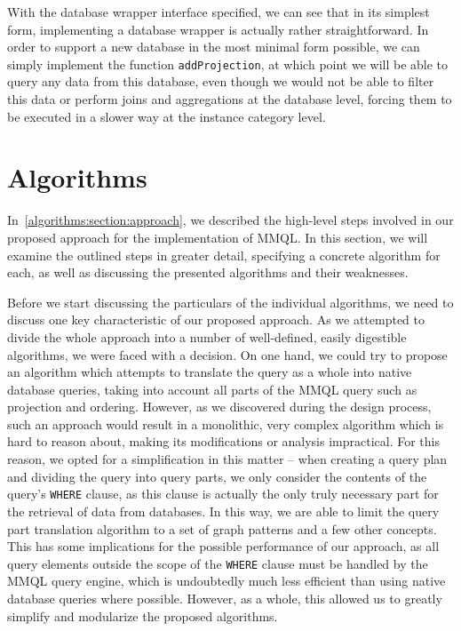 With the database wrapper interface specified, we can see that in its simplest form, implementing a database wrapper is actually rather straightforward.
In order to support a new database in the most minimal form possible, we can simply implement the function \texttt{addProjection}, at which point we will be able to query any data from this database, even though we would not be able to filter this data or perform joins and aggregations at the database level, forcing them to be executed in a slower way at the instance category level.

\section{Algorithms}

In~\cref{algorithms:section:approach}, we described the high-level steps involved in our proposed approach for the implementation of MMQL.
In this section, we will examine the outlined steps in greater detail, specifying a concrete algorithm for each, as well as discussing the presented algorithms and their weaknesses.

Before we start discussing the particulars of the individual algorithms, we need to discuss one key characteristic of our proposed approach.
As we attempted to divide the whole approach into a number of well-defined, easily digestible algorithms, we were faced with a decision.
On one hand, we could try to propose an algorithm which attempts to translate the query as a whole into native database queries, taking into account all parts of the MMQL query such as projection and ordering.
However, as we discovered during the design process, such an approach would result in a monolithic, very complex algorithm which is hard to reason about, making its modifications or analysis impractical.
For this reason, we opted for a simplification in this matter -- when creating a query plan and dividing the query into query parts, we only consider the contents of the query's \texttt{WHERE} clause, as this clause is actually the only truly necessary part for the retrieval of data from databases.
In this way, we are able to limit the query part translation algorithm to a set of graph patterns and a few other concepts.
This has some implications for the possible performance of our approach, as all query elements outside the scope of the \texttt{WHERE} clause must be handled by the MMQL query engine, which is undoubtedly much less efficient than using native database queries where possible.
However, as a whole, this allowed us to greatly simplify and modularize the proposed algorithms.

